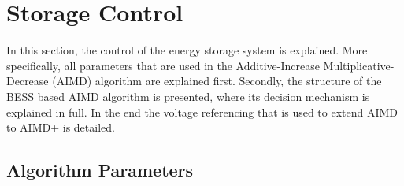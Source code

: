 \section{Storage Control}
\label{ch4:sec:storage-control}

In this section, the control of the energy storage system is explained.
More specifically, all parameters that are used in the Additive-Increase Multiplicative-Decrease (AIMD) algorithm are explained first.
Secondly, the structure of the BESS based AIMD algorithm is presented, where its decision mechanism is explained in full.
In the end the voltage referencing that is used to extend AIMD to AIMD+ is detailed.



\subsection{Algorithm Parameters}



